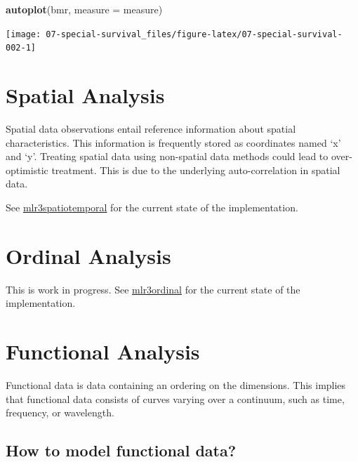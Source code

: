 \documentclass[]{scrbook}
\newenvironment{Shaded}{\begin{snugshade}}{\end{snugshade}}
\newcommand{\DataTypeTok}[1]{\textcolor[rgb]{0.13,0.29,0.53}{#1}}
\newcommand{\KeywordTok}[1]{\textcolor[rgb]{0.13,0.29,0.53}{\textbf{#1}}}
\newcommand{\NormalTok}[1]{#1}
\renewenvironment{Shaded} {\begin{snugshade}\small} {\end{snugshade}}
\begin{document}
\begin{Shaded}
\begin{Highlighting}[]
\KeywordTok{autoplot}\NormalTok{(bmr, }\DataTypeTok{measure =}\NormalTok{ measure)}
\end{Highlighting}
\end{Shaded}

\begin{center}\texttt{[image: 07-special-survival\_files/figure-latex/07-special-survival-002-1]} \end{center}

\hypertarget{spatial}{%
\section{Spatial Analysis}\label{spatial}}

Spatial data observations entail reference information about spatial characteristics.
This information is frequently stored as coordinates named `x' and `y'.
Treating spatial data using non-spatial data methods could lead to over-optimistic treatment.
This is due to the underlying auto-correlation in spatial data.

See \href{https://github.com/mlr-org/mlr3spatiotemporal}{mlr3spatiotemporal} for the current state of the implementation.

\hypertarget{ordinal}{%
\section{Ordinal Analysis}\label{ordinal}}

This is work in progress.
See \href{https://github.com/mlr-org/mlr3ordinal}{mlr3ordinal} for the current state of the implementation.

\hypertarget{functional}{%
\section{Functional Analysis}\label{functional}}

Functional data is data containing an ordering on the dimensions.
This implies that functional data consists of curves varying over a continuum, such as time, frequency, or wavelength.

\hypertarget{how-to-model-functional-data}{%
\subsection{How to model functional data?}\label{how-to-model-functional-data}}
\end{document}
